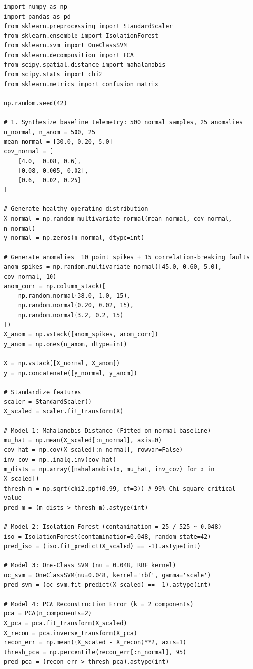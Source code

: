 \begin{lstlisting}[style=pythonstyle, caption={End-to-end comparative anomaly detection benchmark.}, label={lst:anomaly_benchmark}]
import numpy as np
import pandas as pd
from sklearn.preprocessing import StandardScaler
from sklearn.ensemble import IsolationForest
from sklearn.svm import OneClassSVM
from sklearn.decomposition import PCA
from scipy.spatial.distance import mahalanobis
from scipy.stats import chi2
from sklearn.metrics import confusion_matrix

np.random.seed(42)

# 1. Synthesize baseline telemetry: 500 normal samples, 25 anomalies
n_normal, n_anom = 500, 25
mean_normal = [30.0, 0.20, 5.0]
cov_normal = [
    [4.0,  0.08, 0.6],
    [0.08, 0.005, 0.02],
    [0.6,  0.02, 0.25]
]

# Generate healthy operating distribution
X_normal = np.random.multivariate_normal(mean_normal, cov_normal, n_normal)
y_normal = np.zeros(n_normal, dtype=int)

# Generate anomalies: 10 point spikes + 15 correlation-breaking faults
anom_spikes = np.random.multivariate_normal([45.0, 0.60, 5.0], cov_normal, 10)
anom_corr = np.column_stack([
    np.random.normal(38.0, 1.0, 15),
    np.random.normal(0.20, 0.02, 15),
    np.random.normal(3.2, 0.2, 15)
])
X_anom = np.vstack([anom_spikes, anom_corr])
y_anom = np.ones(n_anom, dtype=int)

X = np.vstack([X_normal, X_anom])
y = np.concatenate([y_normal, y_anom])

# Standardize features
scaler = StandardScaler()
X_scaled = scaler.fit_transform(X)

# Model 1: Mahalanobis Distance (Fitted on normal baseline)
mu_hat = np.mean(X_scaled[:n_normal], axis=0)
cov_hat = np.cov(X_scaled[:n_normal], rowvar=False)
inv_cov = np.linalg.inv(cov_hat)
m_dists = np.array([mahalanobis(x, mu_hat, inv_cov) for x in X_scaled])
thresh_m = np.sqrt(chi2.ppf(0.99, df=3)) # 99% Chi-square critical value
pred_m = (m_dists > thresh_m).astype(int)

# Model 2: Isolation Forest (contamination = 25 / 525 ~ 0.048)
iso = IsolationForest(contamination=0.048, random_state=42)
pred_iso = (iso.fit_predict(X_scaled) == -1).astype(int)

# Model 3: One-Class SVM (nu = 0.048, RBF kernel)
oc_svm = OneClassSVM(nu=0.048, kernel='rbf', gamma='scale')
pred_svm = (oc_svm.fit_predict(X_scaled) == -1).astype(int)

# Model 4: PCA Reconstruction Error (k = 2 components)
pca = PCA(n_components=2)
X_pca = pca.fit_transform(X_scaled)
X_recon = pca.inverse_transform(X_pca)
recon_err = np.mean((X_scaled - X_recon)**2, axis=1)
thresh_pca = np.percentile(recon_err[:n_normal], 95)
pred_pca = (recon_err > thresh_pca).astype(int)


\end{lstlisting}
